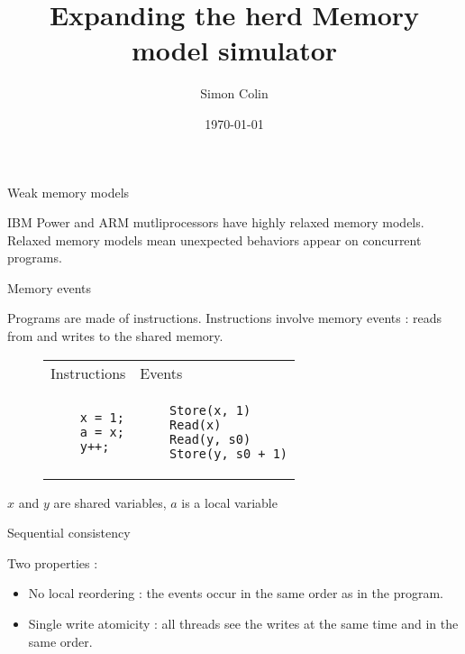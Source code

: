 \documentclass[dvipsnames,svgnames,beamer, 12pt]{beamer}
\title{Expanding the herd Memory model simulator}
\author{Simon Colin}
\date{\today}
\begin{document}
\begin{frame}
	\titlepage
\end{frame}


\begin{frame}{Weak memory models}

 	\vfill
	IBM Power and ARM mutliprocessors have highly relaxed memory models.
	\vfill
	Relaxed memory models mean unexpected behaviors appear on concurrent programs.
	\vfill
	
\end{frame}

\begin{frame}[fragile]{Memory events}

	Programs are made of instructions.
	\vfill 
	Instructions involve memory events : reads from and writes to the shared memory.
	\vfill
	\begin{figure}
	\centering
	\begin{tabular}{p{4cm} p{4cm}}
	Instructions & Events \\
	\begin{verbatim}
	x = 1;
	a = x;
	y++;
	\end{verbatim} &
	\begin{verbatim}
	Store(x, 1)
	Read(x)
	Read(y, s0)
	Store(y, s0 + 1)
	\end{verbatim} \\
	\end{tabular}
	\end{figure}
	{\footnotesize{$x$ and $y$ are shared variables, $a$ is a local variable}}
	\vfill

\end{frame}

\begin{frame}{Sequential consistency}

	Two properties :
	\begin{itemize}
	\item No local reordering : the events occur in the same order as in the program.
	\item Single write atomicity : all threads see the writes at the same time and in the same order.
	\end{itemize}

\end{frame}
\end{document}

